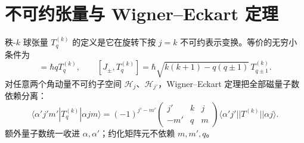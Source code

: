 \section{不可约张量与 Wigner--Eckart 定理}

秩-$k$ 球张量 $T_q^{(k)}$ 的定义是它在旋转下按 $j=k$ 不可约表示变换。等价的无穷小条件为
\begin{equation}
[J_z,T_q^{(k)}]=\hbar qT_q^{(k)},
\qquad
[J_\pm,T_q^{(k)}]
=\hbar\sqrt{k(k+1)-q(q\pm1)}\,T_{q\pm1}^{(k)}.
\label{eq:am-tensor-commutators}
\end{equation}
对任意两个角动量不可约子空间 $\mathcal H_j$、$\mathcal H_{j'}$，Wigner--Eckart 定理把全部磁量子数依赖分离：
\begin{equation}
\langle \alpha'j'm'|T_q^{(k)}|\alpha jm\rangle
=(-1)^{j'-m'}
\begin{pmatrix}
 j'&k&j\\
 -m'&q&m
\end{pmatrix}
\langle \alpha'j'||T^{(k)}||\alpha j\rangle .
\label{eq:wigner-eckart}
\end{equation}
额外量子数统一收进 $\alpha,\alpha'$；约化矩阵元不依赖 $m,m',q$。

